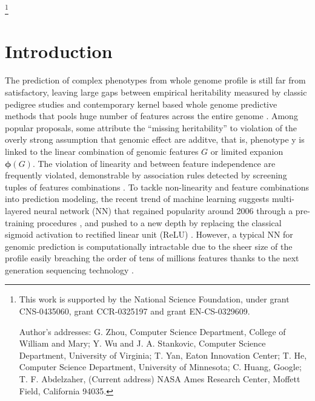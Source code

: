\documentclass[acmtog, authorversion]{acmart}
\begin{document}
%
%




\thanks{This work is supported by the National Science Foundation,
  under grant CNS-0435060, grant CCR-0325197 and grant EN-CS-0329609.

  Author's addresses: G. Zhou, Computer Science Department, College of
  William and Mary; Y. Wu {and} J. A. Stankovic, Computer Science
  Department, University of Virginia; T. Yan, Eaton Innovation Center;
  T. He, Computer Science Department, University of Minnesota; C.
  Huang, Google; T. F. Abdelzaher, (Current address) NASA Ames
  Research Center, Moffett Field, California 94035.}


\maketitle

\newcommand{\bs}[1]{\boldsymbol{#1}}
\section{Introduction}
The prediction of complex phenotypes from whole genome profile is still far from satisfactory, leaving large gaps between empirical heritability measured by classic pedigree studies and contemporary kernel based whole genome predictive methods that pools huge number of features across the entire genome \cite{WGP:Gustavo, WGP:Zhang, GCTA, WGP:GMatrix1, WGP:Review1}. Among popular proposals, some attribute the ``missing heritability'' to violation of the overly strong assumption that genomic effect are additve, that is, phenotype y is linked to the linear combination of genomic features $G$ or limited expanion $\bs{\phi}(G)$. The violation of linearity and between feature independence are frequently violated, demonstrable by association rules detected by screening tuples of features combinations \cite{GWA:GMDR, GWA:MDR}. To tackle non-linearity and feature combinations into prediction modeling, the recent trend of machine learning suggests multi-layered neural network (NN) that regained popularity around 2006 through a pre-training procedures \cite{DL:Intro1}, and pushed to a new depth by replacing the classical sigmoid activation to rectified linear unit (ReLU) \cite{DL:Relu1}. However, a typical NN for genomic prediction is computationally intractable due to the sheer size of the profile easily breaching the order of tens of millions features thanks to the next generation sequencing technology \cite{NGS1}.
\end{document}
